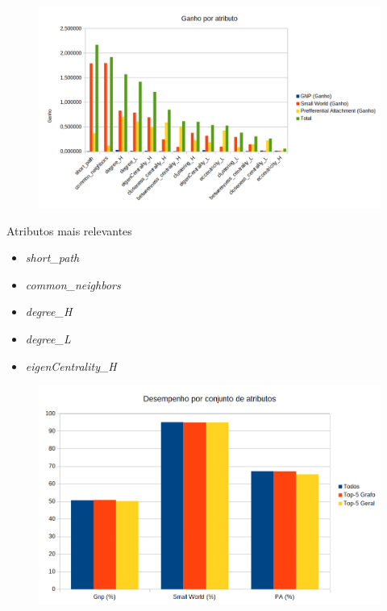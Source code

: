 \documentclass{beamer}
\begin{document}
\begin{frame}
	\begin{figure}[ht]
		\begin{center}
 	 	  \includegraphics[scale=0.5]{figuras/attGanhoArtf.png}	
		  \label{fig:fluxogramaAG}		
		\end{center}
	\end{figure}
\end{frame}

\begin{frame}{Atributos mais relevantes}
	\begin{itemize}
		\item \textit{short\_path}
		\item \textit{common\_neighbors}
		\item \textit{degree\_H}
		\item \textit{degree\_L}
		\item \textit{eigenCentrality\_H}
	\end{itemize}
\end{frame}

\begin{frame}
	\begin{figure}[ht]
		\begin{center}
 	 	  \includegraphics[scale=0.5]{figuras/attrDesempenhoArtf.png}	
		  \label{fig:fluxogramaAG}		
		\end{center}
	\end{figure}
\end{frame}
\end{document}
